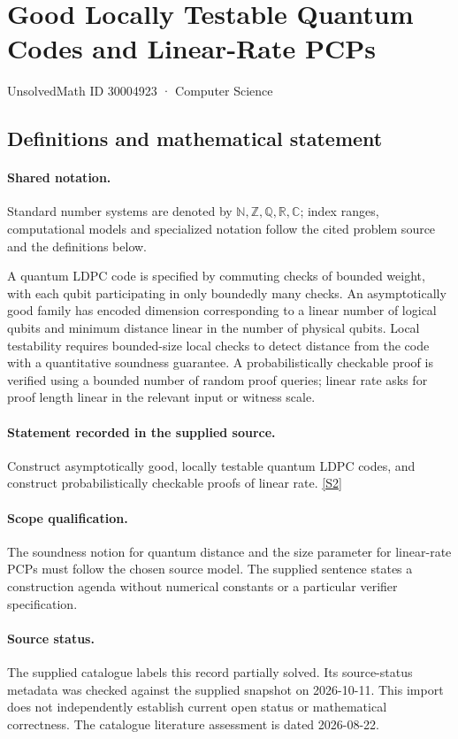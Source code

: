 \documentclass[11pt]{article}
\newcommand{\sref}[2]{\hyperlink{source:#1:#2}{[S#2]}}
\begin{document}
\setcounter{section}{30004922}
\section{Good Locally Testable Quantum Codes and Linear-Rate PCPs}\label{30004923}
{\small\sffamily UnsolvedMath ID 30004923 · Computer Science}
\subsection{Definitions and mathematical statement}

\paragraph{Shared notation.}Standard number systems are denoted by $\mathbb N,\mathbb Z,\mathbb Q,\mathbb R,\mathbb C$; index ranges, computational models and specialized notation follow the cited problem source and the definitions below.


A quantum LDPC code is specified by commuting checks of bounded weight, with each qubit participating in only boundedly many checks. An asymptotically good family has encoded dimension corresponding to a linear number of logical qubits and minimum distance linear in the number of physical qubits. Local testability requires bounded-size local checks to detect distance from the code with a quantitative soundness guarantee. A probabilistically checkable proof is verified using a bounded number of random proof queries; linear rate asks for proof length linear in the relevant input or witness scale.
\paragraph{Statement recorded in the supplied source.}
Construct asymptotically good, locally testable quantum LDPC codes, and construct probabilistically checkable proofs of linear rate. \sref{30004923}{2}
\paragraph{Scope qualification.}
The soundness notion for quantum distance and the size parameter for linear-rate PCPs must follow the chosen source model. The supplied sentence states a construction agenda without numerical constants or a particular verifier specification.
\paragraph{Source status.}
The supplied catalogue labels this record partially solved. Its source-status metadata was checked against the supplied snapshot on 2026-10-11. This import does not independently establish current open status or mathematical correctness. The catalogue literature assessment is dated 2026-08-22.
\end{document}
